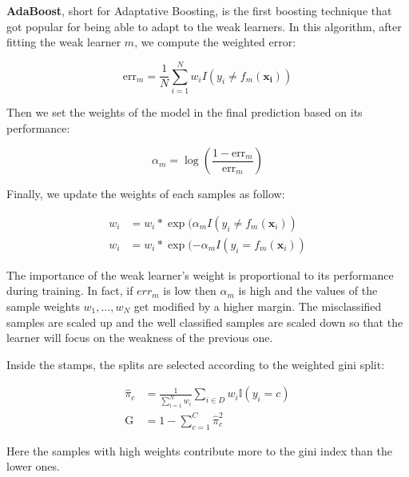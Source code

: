 \documentclass[12pt]{report}
\begin{document}
            \textbf{AdaBoost}, short for Adaptative Boosting, is the first boosting technique that got popular for being able to adapt to the weak learners.
            In this algorithm, after fitting the weak learner $m$, we compute the weighted error:
            
            \begin{equation}
                \text{err}_m = \frac{1}{N}\sum_{i=1}^{N}w_i I\left(y_i \neq f_m(\boldsymbol{x_i})\right)
            \end{equation}
            
            Then we set the weights of the model in the final prediction based on its performance:
            
            \begin{equation}
                \alpha_m = \log\left(\frac{1 - \text{err}_m}{\text{err}_m}\right)
            \end{equation}
            
            Finally, we update the weights of each samples as follow:
            
            \begin{align}
                w_i &= w_i * \exp(\alpha_m I\left(y_i \neq f_m(\boldsymbol{x}_i)\right)\\
                w_i &= w_i * \exp(-\alpha_m I\left(y_i = f_m(\boldsymbol{x}_i)\right)
            \end{align}
            
            The importance of the weak learner's weight is proportional to its performance during training.
            In fact, if $err_m$ is low then $\alpha_m$ is high and the values of the sample weights $w_1, \dots, w_N$ get modified by a higher margin.
            The misclassified samples are scaled up and the well classified samples are scaled down so that the learner will focus on the weakness of the previous one.
            
            Inside the stamps, the splits are selected according to the weighted gini split:
            
            \begin{align}
                \hat{\pi}_c &= \frac{1}{\sum_{i=1}^{N}w_i} \sum_{i \in D}w_i\mathbb{I}(y_i = c)\\
                \text{G} &= 1 - \sum_{c=1}^{C}\hat{\pi}^2_c
            \end{align}
            
            Here the samples with high weights contribute more to the gini index than the lower ones.
            
\end{document}
